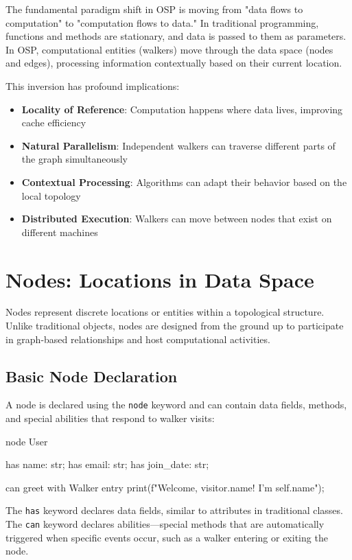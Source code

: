 The fundamental paradigm shift in OSP is moving from "data flows to computation" to "computation flows to data." In traditional programming, functions and methods are stationary, and data is passed to them as parameters. In OSP, computational entities (walkers) move through the data space (nodes and edges), processing information contextually based on their current location.

This inversion has profound implications:
\begin{itemize}
    \item \textbf{Locality of Reference}: Computation happens where data lives, improving cache efficiency
    \item \textbf{Natural Parallelism}: Independent walkers can traverse different parts of the graph simultaneously
    \item \textbf{Contextual Processing}: Algorithms can adapt their behavior based on the local topology
    \item \textbf{Distributed Execution}: Walkers can move between nodes that exist on different machines
\end{itemize}

\section{Nodes: Locations in Data Space}

Nodes represent discrete locations or entities within a topological structure. Unlike traditional objects, nodes are designed from the ground up to participate in graph-based relationships and host computational activities.

\subsection{Basic Node Declaration}

A node is declared using the \texttt{node} keyword and can contain data fields, methods, and special abilities that respond to walker visits:

\begin{jacblock}
node User {
    has name: str;
    has email: str;
    has join_date: str;

    can greet with Walker entry {
        print(f"Welcome, {visitor.name}! I'm {self.name}");
    }
}
\end{jacblock}

The \texttt{has} keyword declares data fields, similar to attributes in traditional classes. The \texttt{can} keyword declares abilities—special methods that are automatically triggered when specific events occur, such as a walker entering or exiting the node.

